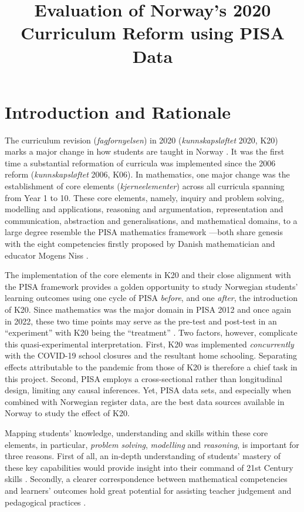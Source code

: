 \documentclass[
    a4paper,                %
    11pt,                   %
    stu,                    %
    donotrepeattitle,       %
    floatsintext,           %
    biblatex,               %
    colorlinks=true,        %
    linkcolor=red,          %
    anchorcolor=black,      %
    citecolor=blue,         %
    urlcolor=blue,          %
    bookmarks=true,         %
    bookmarksopen=false,    %
    bookmarksnumbered=true, %
    dvipsnames              %
]{apa7}
\title{Evaluation of Norway's 2020 Curriculum Reform using PISA Data}
\begin{document}
\maketitle

\setcounter{page}{1}

\section{Introduction and Rationale}

The curriculum revision (\textit{fagfornyelsen}) in 2020 (\textit{kunnskapsl{\o}ftet} 2020, K20) marks a major change in how students are taught in Norway \parencite{udir:2020}. It was the first time a substantial reformation of curricula was implemented since the 2006 reform (\textit{kunnskapsl{\o}ftet} 2006, K06). In mathematics, one major change was the establishment of core elements (\textit{kjerneelementer}) across all curricula spanning from Year 1 to 10. These core elements, namely, inquiry and problem solving, modelling and applications, reasoning and argumentation, representation and communication, abstraction and generalisations, and mathematical domains, to a large degree resemble the PISA mathematics framework \parencite{oecd:2018}---both share genesis with the eight competencies firstly proposed by Danish mathematician and educator Mogens Niss \parencite{niss:2003,niss:2011,niss:2019}.

The implementation of the core elements in K20 and their close alignment with the PISA framework provides a golden opportunity to study Norwegian students' learning outcomes using one cycle of PISA \emph{before}, and one \emph{after}, the introduction of K20. Since mathematics was the major domain in PISA 2012 and once again in 2022, these two time points may serve as the pre-test and post-test in an ``experiment'' with K20 being the ``treatment'' \parencite{shadish:2002}. Two factors, however, complicate this quasi-experimental interpretation. First, K20 was implemented \emph{concurrently} with the COVID-19 school closures and the resultant home schooling. Separating effects attributable to the pandemic from those of K20 is therefore a chief task in this project. Second, PISA employs a cross-sectional rather than longitudinal design, limiting any causal inferences. Yet, PISA data sets, and especially when combined with Norwegian register data, are the best data sources available in Norway to study the effect of K20.

Mapping students' knowledge, understanding and skills within these core elements, in particular, \emph{problem solving}, \emph{modelling} and \emph{reasoning}, is important for three reasons. First of all, an in-depth understanding of students' mastery of these key capabilities would provide insight into their command of 21st Century skills \parencite[][p. 31]{oecd:2018}. Secondly, a clearer correspondence between mathematical competencies and learners' outcomes hold great potential for assisting teacher judgement and pedagogical practices \parencite{pettersen:2019}.
\end{document}
